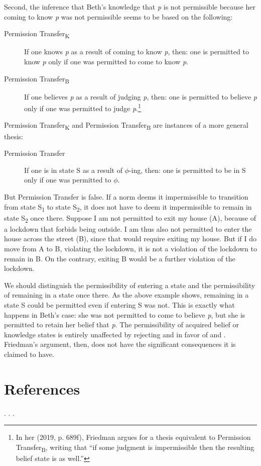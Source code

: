 \documentclass[12pt]{article}
\begin{document}
Second, the inference that Beth's knowledge that \textit{p} is not permissible because her coming to know \textit{p} was not permissible seems to be based on the following:

\newcommand{\pp}{Permission Transfer}
\newcommand{\ppk}{\pp{\textsubscript{K}}}
\newcommand{\ppb}{\pp{\textsubscript{B}}}
\begin{description}
    \item[\ppk] If one knows \textit{p} as a result of coming to know \textit{p}, then: one is permitted to know \textit{p} only if one was permitted to come to know \textit{p}.
    \item[\ppb] If one believes \textit{p} as a result of judging \textit{p}, then: one is permitted to believe \textit{p} only if one was permitted to judge \textit{p}.\footnote{In her (2019, p. 689f), Friedman argues for a thesis equivalent to \ppb{}, writing that ``if some judgment is impermissible then the resulting belief state is as well.''}
\end{description}
%
\ppk{} and \ppb{} are instances of a more general thesis:

\begin{description}
    \item[\pp] If one is in state S as a result of $\phi$-ing, then: one is permitted to be in S only if one was permitted to $\phi$.
\end{description}
%
But \pp{} is false. If a norm deems it impermissible to transition from state S\textsubscript{1} to state S\textsubscript{2}, it does not have to deem it impermissible to remain in state S\textsubscript{2} once there. Suppose I am not permitted to exit my house (A), because of a lockdown that forbids being outside. I am thus also not permitted to enter the house across the street (B), since that would require exiting my house. But if I do move from A to B, violating the lockdown, it is not a violation of the lockdown to remain in B. On the contrary, exiting B would be a further violation of the lockdown.

We should distinguish the permissibility of entering a state and the permissibility of remaining in a state once there. As the above example shows, remaining in a state S could be permitted even if entering S was not. This is exactly what happens in Beth's case: she was not permitted to come to believe \textit{p}, but she is permitted to retain her belief that \textit{p}. The permissibility of acquired belief or knowledge states is entirely unaffected by rejecting \ep{} and \eo{} in favor of \ep*{} and \eo*{}. Friedman's argument, then, does not have the significant consequences it is claimed to have.

\section{References}

. . .
\end{document}
